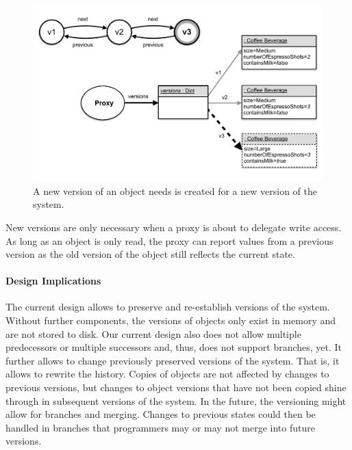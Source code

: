 \begin{figure}[h]
    \centering
    \includegraphics[width=\textwidth]{figures/4_approach/10_newVersionOfAnObject.pdf}
    \caption{A new version of an object needs is created for a new version of the system.}
    \label{fig:NewVersion}
\end{figure}

New versions are only necessary when a proxy is about to delegate write access.
As long as an object is only read, the proxy can report values from a previous version as the old version of the object still reflects the current state.

\paragraph{Design Implications}
The current design allows to preserve and re-establish versions of the system.
Without further components, the versions of objects only exist in memory and are not stored to disk.
Our current design also does not allow multiple predecessors or multiple successors and, thus, does not support branches, yet.
It further allows to change previously preserved versions of the system.
That is, it allows to rewrite the history.
Copies of objects are not affected by changes to previous versions, but changes to object versions that have not been copied shine through in subsequent versions of the system.
In the future, the versioning might allow for branches and merging.
Changes to previous states could then be handled in branches that programmers may or may not merge into future versions.






